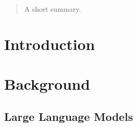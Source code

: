 \documentclass[english,master]{swsLeipzig}
\begin{document}
\begin{frontmatter}
  \begin{abstract}
    A short summary.
  \end{abstract}

  \tableofcontents





\end{frontmatter}

\chapter{Introduction}\label{introduction}


\chapter{Background}\label{background}
\section{Large Language Models}\label{llm}


\appendix
\end{document}
